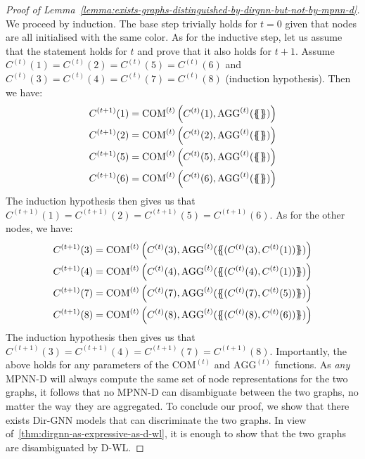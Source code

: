 \documentclass{article}
\newcommand\oursacro{Dir-GNN}
\newcommand*{\ldblbrace}{\{\mskip-6mu\{}
\newcommand*{\rdblbrace}{\}\mskip-6mu\}}
\theoremstyle{plain}
\theoremstyle{definition}
\theoremstyle{remark}
\begin{document}
\begin{proof}[Proof of Lemma~\ref{lemma:exists-graphs-distinguished-by-dirgnn-but-not-by-mpnn-d}]
    We proceed by induction. The base step trivially holds for $t=0$ given that nodes are all initialised with the same color. As for the inductive step, let us assume that the statement holds for $t$ and prove that it also holds for $t+1$.
    Assume $C^{(t)}(1) = C^{(t)}(2) = C^{(t)}(5) = C^{(t)}(6)$ and $C^{(t)}(3) = C^{(t)}(4) = C^{(t)}(7) = C^{(t)}(8)$ (induction hypothesis).
    Then we have:
    \begin{align*}
        C^{(t+1)}(1) &= \mathrm{COM}^{(t)}\left(C^{(t)}(1), \mathrm{AGG}^{(t)}(\ldblbrace  \rdblbrace)\right) \\
        C^{(t+1)}(2) &= \mathrm{COM}^{(t)}\left(C^{(t)}(2), \mathrm{AGG}^{(t)}(\ldblbrace  \rdblbrace)\right) \\
        C^{(t+1)}(5) &= \mathrm{COM}^{(t)}\left(C^{(t)}(5), \mathrm{AGG}^{(t)}(\ldblbrace  \rdblbrace)\right) \\
        C^{(t+1)}(6) &= \mathrm{COM}^{(t)}\left(C^{(t)}(6), \mathrm{AGG}^{(t)}(\ldblbrace  \rdblbrace)\right) \\
    \end{align*}
    The induction hypothesis then gives us that $C^{(t+1)}(1) = C^{(t+1)}(2) = C^{(t+1)}(5) = C^{(t+1)}(6)$.
    As for the other nodes, we have:
    \begin{align*}
        C^{(t+1)}(3) &= \mathrm{COM}^{(t)}\left(C^{(t)}(3), \mathrm{AGG}^{(t)}(\ldblbrace (C^{(t)}(3), C^{(t)}(1)) \rdblbrace)\right) \\
        C^{(t+1)}(4) &= \mathrm{COM}^{(t)}\left(C^{(t)}(4), \mathrm{AGG}^{(t)}(\ldblbrace (C^{(t)}(4), C^{(t)}(1)) \rdblbrace)\right) \\
        C^{(t+1)}(7) &= \mathrm{COM}^{(t)}\left(C^{(t)}(7), \mathrm{AGG}^{(t)}(\ldblbrace (C^{(t)}(7), C^{(t)}(5)) \rdblbrace)\right) \\
        C^{(t+1)}(8) &= \mathrm{COM}^{(t)}\left(C^{(t)}(8), \mathrm{AGG}^{(t)}(\ldblbrace (C^{(t)}(8), C^{(t)}(6)) \rdblbrace)\right) \\
    \end{align*}
    The induction hypothesis then gives us that $C^{(t+1)}(3) = C^{(t+1)}(4) = C^{(t+1)}(7) = C^{(t+1)}(8)$. Importantly, the above holds for any parameters of the $\textrm{COM}^{(t)}$ and $\textrm{AGG}^{(t)}$ functions. As \emph{any} MPNN-D will always compute the same set of node representations for the two graphs, it follows that no MPNN-D can disambiguate between the two graphs, no matter the way they are aggregated. To conclude our proof, we show that there exists \oursacro{} models that can discriminate the two graphs. In view of~\cref{thm:dirgnn-as-expressive-as-d-wl}, it is enough to show that the two graphs are disambiguated by D-WL.

\end{proof}
\end{document}
